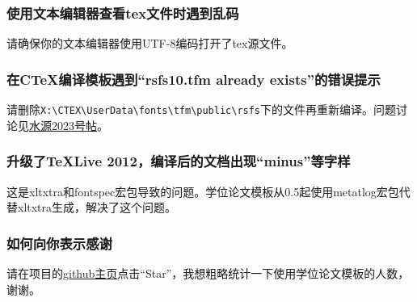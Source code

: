 \subsubsection*{使用文本编辑器查看tex文件时遇到乱码}
请确保你的文本编辑器使用UTF-8编码打开了tex源文件。

\subsubsection*{在CTeX编译模板遇到``rsfs10.tfm already exists''的错误提示}
请删除\verb+X:\CTEX\UserData\fonts\tfm\public\rsfs+下的文件再重新编译。问题讨论见\href{https://bbs.sjtu.edu.cn/bbstcon,board,TeX_LaTeX,reid,1352982719.html}{水源2023号帖}。

\subsubsection*{升级了TeXLive 2012，编译后的文档出现``minus''等字样}
这是xltxtra和fontspec宏包导致的问题。学位论文模板从0.5起使用metatlog宏包代替xltxtra生成，解决了这个问题。

\subsubsection*{如何向你表示感谢}
请在项目的\href{https://github.com/weijianwen/sjtu-thesis-template-latex}{github主页}点击``Star''，我想粗略统计一下使用学位论文模板的人数，谢谢。
